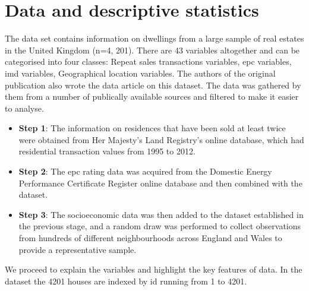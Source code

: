 \documentclass[12pt]{article}
\begin{document}
\section{Data and descriptive statistics}
The data set contains information on dwellings from a large sample of real estates in the United Kingdom (n=4, 201). There are 43 variables altogether and can be categorised into four classes: Repeat sales transactions variables, \acrfull{epc} variables, \acrfull{imd} variables, Geographical location variables. The authors of the original publication also wrote the data article on this dataset. 
The data was gathered by them from a number of publically available sources and filtered to make it easier to analyse.
\begin{itemize}
    \item \textbf{Step 1}: The information on residences that have been sold at least twice were obtained from Her Majesty's Land Registry's online database, which had residential transaction values from 1995 to 2012. 
    \item \textbf{Step 2}: The \acrshort{epc} rating data was acquired from the Domestic Energy Performance Certificate Register online database and then combined with the dataset. 
    \item \textbf{Step 3}: The socioeconomic data was then added to the dataset established in the previous stage, and a random draw was performed to collect observations from hundreds of different neighbourhoods across England and Wales to provide a representative sample. 
\end{itemize}
We proceed to explain the variables and highlight the key features of data. In the dataset the 4201 houses are indexed by id running from 1 to 4201.
\end{document}

